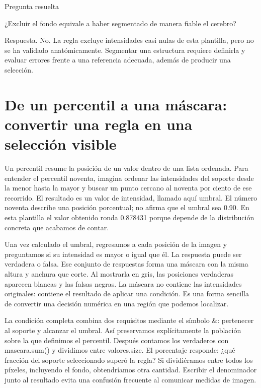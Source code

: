 
\begin{Idea}{Pregunta resuelta}

¿Excluir el fondo equivale a haber segmentado de manera fiable el cerebro?


Respuesta. No. La regla excluye intensidades casi nulas de esta plantilla, pero no se ha validado anatómicamente. Segmentar una estructura requiere definirla y evaluar errores frente a una referencia adecuada, además de producir una selección.


\end{Idea}

\clearpage

\section{De un percentil a una máscara: convertir una regla en una selección visible}


Un percentil resume la posición de un valor dentro de una lista ordenada. Para entender el percentil noventa, imagina ordenar las intensidades del soporte desde la menor hasta la mayor y buscar un punto cercano al noventa por ciento de ese recorrido. El resultado es un valor de intensidad, llamado aquí umbral. El número noventa describe una posición porcentual; no afirma que el umbral sea 0.90. En esta plantilla el valor obtenido ronda 0.878431 porque depende de la distribución concreta que acabamos de contar.


Una vez calculado el umbral, regresamos a cada posición de la imagen y preguntamos si su intensidad es mayor o igual que él. La respuesta puede ser verdadera o falsa. Ese conjunto de respuestas forma una máscara con la misma altura y anchura que corte. Al mostrarla en gris, las posiciones verdaderas aparecen blancas y las falsas negras. La máscara no contiene las intensidades originales: contiene el resultado de aplicar una condición. Es una forma sencilla de convertir una decisión numérica en una región que podemos localizar.


La condición completa combina dos requisitos mediante el símbolo \&: pertenecer al soporte y alcanzar el umbral. Así preservamos explícitamente la población sobre la que definimos el percentil. Después contamos los verdaderos con mascara.sum() y dividimos entre valores.size. El porcentaje responde: ¿qué fracción del soporte seleccionado superó la regla? Si dividiéramos entre todos los píxeles, incluyendo el fondo, obtendríamos otra cantidad. Escribir el denominador junto al resultado evita una confusión frecuente al comunicar medidas de imagen.



